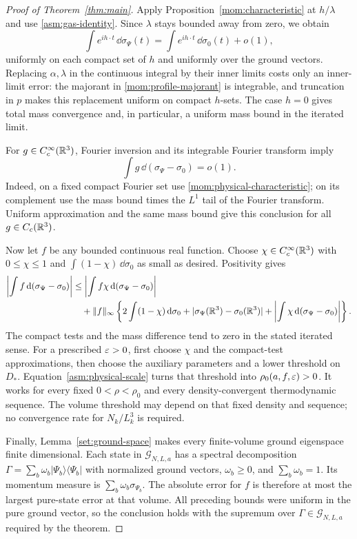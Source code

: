 \begin{proof}[Proof of Theorem~\ref{thm:main}]
Apply Proposition~\ref{mom:characteristic} at $h/\lambda$ and use
\eqref{asm:gas-identity}. Since $\lambda$ stays bounded away from
zero, we obtain
\begin{equation}\label{mom:physical-characteristic}
 \int e^{ih\cdot t}\,\dd\sigma_\Psi(t)
       =\int e^{ih\cdot t}\,\dd\sigma_0(t)+o(1),
\end{equation}
uniformly on each compact set of $h$ and uniformly over the ground
vectors. Replacing $\alpha,\lambda$ in the continuous integral by
their inner limits costs only an inner-limit error: the majorant in
\eqref{mom:profile-majorant} is integrable, and truncation in $p$ makes
this replacement uniform on compact $h$-sets. The case $h=0$ gives
total mass convergence and, in particular, a uniform mass bound in
the iterated limit.

For $g\in C_c^\infty(\mathbb R^3)$, Fourier inversion and its integrable
Fourier transform imply
\[
 \int g\,\dd(\sigma_\Psi-\sigma_0)=o(1).
\]
Indeed, on a fixed compact Fourier set use
\eqref{mom:physical-characteristic}; on its complement use the mass
bound times the $L^1$ tail of the Fourier transform. Uniform
approximation and the same mass bound give this conclusion for all
$g\in C_c(\mathbb R^3)$.

Now let $f$ be any bounded continuous real function. Choose
$\chi\in C_c^\infty(\mathbb R^3)$ with $0\le\chi\le1$ and
$\int(1-\chi)\,\dd\sigma_0$ as small as desired. Positivity gives
\begin{align}
 \left|\int f\,\mathrm d(\sigma_\Psi-\sigma_0)\right|
 &\le\left|\int f\chi\,\mathrm d(\sigma_\Psi-\sigma_0)\right|\notag\\
 &\quad+\|f\|_\infty\left\{
       2\int(1-\chi)\,\mathrm d\sigma_0
       +|\sigma_\Psi(\mathbb R^3)-\sigma_0(\mathbb R^3)|
       +\left|\int\chi\,\mathrm d(\sigma_\Psi-\sigma_0)\right|\right\}.
 \label{mom:tightness}
\end{align}
The compact tests and the mass difference tend to zero in the stated
iterated sense. For a prescribed $\varepsilon>0$, first choose $\chi$ and
the compact-test approximations, then choose the auxiliary parameters
and a lower threshold on $D_*$. Equation~\eqref{asm:physical-scale}
turns that threshold into $\rho_0(a,f,\varepsilon)>0$. It works for every
fixed $0<\rho<\rho_0$ and every density-convergent thermodynamic
sequence. The volume threshold may depend on that fixed density and
sequence; no convergence rate for $N_k/L_k^3$ is required.

Finally, Lemma~\ref{set:ground-space} makes every finite-volume ground
eigenspace finite dimensional. Each state in $\mathcal G_{N,L,a}$
has a spectral decomposition
$\Gamma=\sum_b\omega_b|\Psi_b\rangle\langle\Psi_b|$ with
normalized ground vectors, $\omega_b\ge0$, and $\sum_b\omega_b=1$.
Its momentum measure is $\sum_b\omega_b\sigma_{\Psi_b}$. The absolute
error for $f$ is therefore at most the largest pure-state error at
that volume. All preceding bounds were uniform in the pure ground
vector, so the conclusion holds with the supremum over
$\Gamma\in\mathcal G_{N,L,a}$ required by the theorem.
\end{proof}
